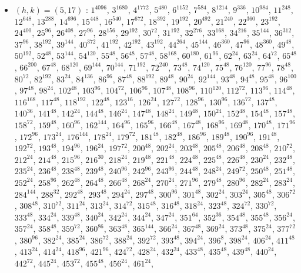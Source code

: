 \begin{itemize}
\item $(h,k)=(5,17)$ : $1^{4096}$, $3^{1680}$, $4^{1772}$, $5^{480}$, $6^{1152}$, $7^{584}$, $8^{1214}$, $9^{336}$, $10^{984}$, $11^{248}$, $12^{648}$, $13^{288}$, $14^{696}$, $15^{448}$, $16^{540}$, $17^{672}$, $18^{392}$, $19^{192}$, $20^{492}$, $21^{240}$, $22^{360}$, $23^{192}$, $24^{400}$, $25^{96}$, $26^{408}$, $27^{96}$, $28^{156}$, $29^{192}$, $30^{72}$, $31^{192}$, $32^{276}$, $33^{168}$, $34^{216}$, $35^{144}$, $36^{312}$, $37^{96}$, $38^{192}$, $39^{144}$, $40^{372}$, $41^{192}$, $42^{192}$, $43^{192}$, $44^{264}$, $45^{144}$, $46^{360}$, $47^{96}$, $48^{360}$, $49^{48}$, $50^{192}$, $52^{48}$, $53^{144}$, $54^{120}$, $55^{48}$, $56^{48}$, $57^{48}$, $58^{168}$, $60^{180}$, $61^{96}$, $62^{24}$, $63^{24}$, $64^{72}$, $65^{48}$, $66^{200}$, $67^{48}$, $68^{120}$, $69^{144}$, $70^{144}$, $71^{192}$, $72^{240}$, $73^{48}$, $74^{120}$, $75^{48}$, $76^{120}$, $77^{96}$, $78^{48}$, $80^{72}$, $82^{192}$, $83^{24}$, $84^{136}$, $86^{96}$, $87^{48}$, $88^{192}$, $89^{48}$, $90^{24}$, $92^{144}$, $93^{48}$, $94^{48}$, $95^{48}$, $96^{100}$, $97^{48}$, $98^{24}$, $102^{48}$, $103^{96}$, $104^{72}$, $106^{96}$, $107^{48}$, $108^{96}$, $110^{120}$, $112^{72}$, $113^{96}$, $114^{48}$, $116^{168}$, $117^{48}$, $118^{192}$, $122^{48}$, $123^{16}$, $126^{24}$, $127^{72}$, $128^{96}$, $130^{96}$, $136^{72}$, $137^{48}$, $140^{36}$, $141^{48}$, $142^{24}$, $144^{48}$, $146^{24}$, $147^{48}$, $148^{24}$, $149^{48}$, $150^{24}$, $152^{48}$, $154^{48}$, $157^{48}$, $158^{72}$, $159^{48}$, $160^{96}$, $162^{144}$, $164^{96}$, $165^{96}$, $166^{48}$, $167^{48}$, $168^{96}$, $169^{48}$, $170^{48}$, $171^{96}$, $172^{96}$, $173^{24}$, $176^{144}$, $178^{24}$, $179^{72}$, $181^{48}$, $182^{48}$, $186^{96}$, $189^{48}$, $190^{96}$, $191^{48}$, $192^{72}$, $193^{48}$, $194^{96}$, $196^{24}$, $197^{72}$, $200^{48}$, $202^{24}$, $203^{48}$, $205^{48}$, $206^{48}$, $208^{48}$, $210^{72}$, $212^{24}$, $214^{48}$, $215^{96}$, $216^{30}$, $218^{24}$, $219^{48}$, $221^{48}$, $224^{48}$, $225^{48}$, $226^{48}$, $230^{24}$, $232^{48}$, $235^{24}$, $236^{48}$, $238^{48}$, $239^{48}$, $240^{96}$, $242^{96}$, $243^{96}$, $244^{48}$, $248^{24}$, $249^{72}$, $250^{48}$, $251^{48}$, $252^{24}$, $258^{96}$, $262^{48}$, $264^{48}$, $266^{48}$, $268^{24}$, $270^{24}$, $271^{96}$, $279^{48}$, $280^{96}$, $282^{24}$, $283^{24}$, $284^{144}$, $288^{32}$, $292^{48}$, $293^{48}$, $294^{24}$, $297^{48}$, $300^{96}$, $301^{48}$, $302^{24}$, $303^{24}$, $305^{48}$, $306^{72}$, $308^{48}$, $310^{72}$, $311^{24}$, $313^{24}$, $314^{72}$, $315^{48}$, $316^{48}$, $318^{24}$, $323^{48}$, $324^{72}$, $330^{72}$, $333^{48}$, $334^{24}$, $339^{48}$, $340^{24}$, $342^{24}$, $344^{24}$, $347^{24}$, $351^{64}$, $352^{36}$, $354^{48}$, $355^{48}$, $356^{24}$, $357^{24}$, $358^{48}$, $359^{72}$, $360^{86}$, $363^{48}$, $365^{144}$, $366^{24}$, $367^{48}$, $369^{24}$, $373^{48}$, $375^{24}$, $377^{72}$, $380^{96}$, $382^{24}$, $385^{24}$, $386^{72}$, $388^{24}$, $392^{72}$, $393^{48}$, $394^{24}$, $396^{8}$, $398^{24}$, $406^{24}$, $411^{48}$, $413^{24}$, $414^{24}$, $418^{96}$, $421^{96}$, $424^{72}$, $428^{24}$, $432^{24}$, $433^{48}$, $435^{48}$, $439^{48}$, $440^{24}$, $442^{72}$, $445^{24}$, $453^{72}$, $455^{48}$, $456^{24}$, $461^{24}$, 
\end{itemize}
